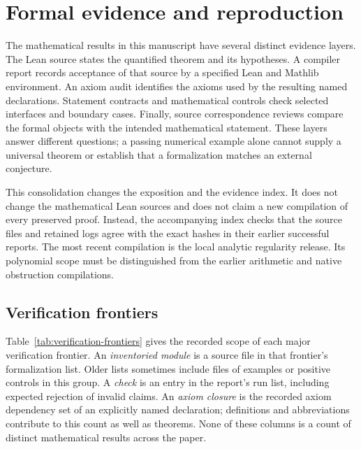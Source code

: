 \section{Formal evidence and reproduction}
\label{sec:verification}

The mathematical results in this manuscript have several distinct evidence
layers. The Lean source states the quantified theorem and its hypotheses. A
compiler report records acceptance of that source by a specified Lean and
Mathlib environment. An axiom audit identifies the axioms used by the resulting
named declarations. Statement contracts and mathematical controls check
selected interfaces and boundary cases. Finally, source correspondence reviews
compare the formal objects with the intended mathematical statement. These
layers answer different questions; a passing numerical example alone cannot
supply a universal theorem or establish that a formalization matches an
external conjecture.

This consolidation changes the exposition and the evidence index. It does not
change the mathematical Lean sources and does not claim a new compilation of
every preserved proof. Instead, the accompanying index checks that the source
files and retained logs agree with the exact hashes in their earlier successful
reports. The most recent compilation is the local analytic regularity release.
Its polynomial scope must be distinguished from the earlier arithmetic and
native obstruction compilations.

\subsection{Verification frontiers}

Table~\ref{tab:verification-frontiers} gives the recorded scope of each major
verification frontier. An \emph{inventoried module} is a source file in that
frontier's formalization list. Older lists sometimes include files of examples
or positive controls in this group. A \emph{check} is an entry in the report's
run list, including expected rejection of invalid claims. An \emph{axiom
closure} is the recorded axiom dependency set of an explicitly named
declaration; definitions and abbreviations contribute to this count as well
as theorems. None of these columns is a count of distinct mathematical results
across the paper.

